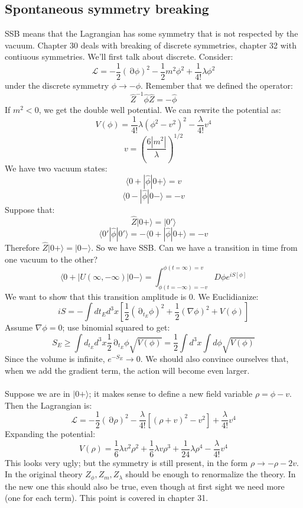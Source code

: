 \documentclass[12 pt]{article}
\DeclareMathOperator {\p} {\partial}
\begin{document}
\subsection*{Spontaneous symmetry breaking}
SSB means that the Lagrangian has some symmetry that is not respected by the vacuum. Chapter 30 deals with breaking of discrete symmetries, chapter 32 with contiuous symmetries. We'll first talk about discrete. Consider:
\[       \mathcal{L} = - \frac{1}{2} (\p \phi)^2 - \frac{1}{2} m^2 \phi^2 + \frac{1}{4!} \lambda \phi^2      \]
under the discrete symmetry $\phi \to - \phi$. Remember that we defined the operator:
\[     \hat Z^{-1}\hat \phi \hat Z = - \hat \phi      \]
If $m^2<0$, we get the double well potential. We can rewrite the potential as:
\[      V(\phi) = \frac{1}{4!} \lambda (\phi^2 - v^2)^2 - \frac{\lambda}{4!} v^4  \]
\[        v = \left( \frac{6|m^2|}{\lambda} \right)^{1/2}         \]
We have two vacuum states:
\[        \langle 0+| \hat \phi | 0 +\rangle = v         \]
\[        \langle 0-| \hat \phi | 0 -\rangle = -v         \]
Suppose that:
\[      \hat Z |0+\rangle = |0'\rangle     \]
\[        \langle 0'| \hat \phi | 0'\rangle = - \langle 0+| \hat \phi | 0 +\rangle = - v       \]
Therefore $\hat Z |0+\rangle = |0-\rangle$. So we have SSB. Can we have a transition in time from one vacuum to the other?
\[         \langle 0+| U(\infty, - \infty) |0-\rangle = \int_{\phi(t=-\infty)=-v}^{\phi(t=\infty)=v} D\phi e^{iS[\phi]}        \]
We want to show that this transition amplitude is 0. We Euclidianize:
\[        iS = - \int dt_E  d^3 x \left[ \frac{1}{2} (\p_{t_E} \phi)^2 + \frac{1}{2} (\nabla \phi)^2 + V(\phi)   \right]       \]
Assume $\nabla \phi = 0$; use binomial squared to get:
\[   S_E \geq \int d_{t_E} d^3 x \frac{1}{2} \p_{t_E} \phi \sqrt{V(\phi)} = \frac{1}{2} \int d^3 x \int d\phi \sqrt{V(\phi)}   \]
Since the volume is infinite, $e^{-S_E} \to 0$. We should also convince ourselves that, when we add the gradient term, the action will become even larger.
\\
\\
Suppose we are in $|0+\rangle$; it makes sense to define a new field variable $\rho = \phi - v$. Then the Lagrangian is:
\[      \mathcal{L} = - \frac{1}{2} (\p \rho)^2 - \frac{\lambda}{4!} \left[ (\rho + v)^2 - v^2  \right]  + \frac{\lambda}{4!} v^4    \]
Expanding the potential:
\[       V(\rho) = \frac{1}{6} \lambda v^2 \rho^2 + \frac{1}{6} \lambda v \rho^3 + \frac{1}{24} \lambda \rho^4 - \frac{\lambda}{4!} v^4       \]
This looks very ugly; but the symmetry is still present, in the form $\rho \to -\rho - 2v$. In the original theory $Z_{\phi}, Z_m, Z_{\lambda}$ should be enough to renormalize the theory. In the new one this should also be true, even though at first sight we need more (one for each term). This point is covered in chapter 31.
\end{document}
